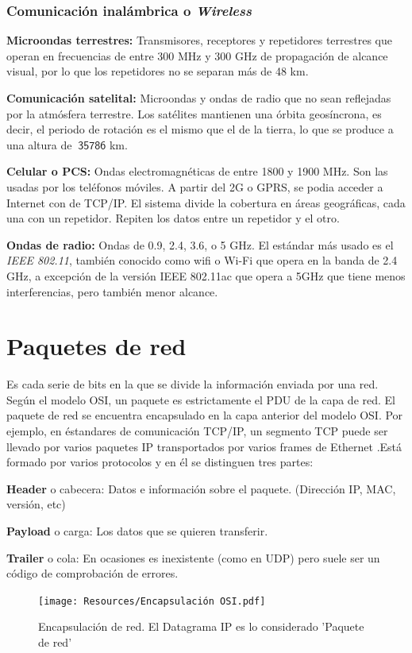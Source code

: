 \documentclass[a4paper, 11pt]{report} %
\begin{document}
\subsubsection{Comunicación inalámbrica o \textit{Wireless}}
\begin{description}
\item \textbf{Microondas terrestres:} Transmisores, receptores y repetidores terrestres que operan en frecuencias de entre 300 MHz y 300 GHz de propagación de alcance visual, por lo que los repetidores no se separan más de 48 km.
\item \textbf{Comunicación satelital:} Microondas y ondas de radio que no sean reflejadas por la atmósfera terrestre. Los satélites mantienen una órbita geosíncrona, es decir, el periodo de rotación es el mismo que el de la tierra, lo que se produce a una altura de $\mathsf{~35786}$ km.
\item \textbf{Celular o PCS:} Ondas electromagnéticas de entre 1800 y 1900 MHz. Son las usadas por los teléfonos móviles. A partir del 2G o GPRS, se podia acceder a Internet con de TCP/IP. El sistema divide la cobertura en áreas geográficas, cada una con un repetidor. Repiten los datos entre un repetidor y el otro.
\item \textbf{Ondas de radio:} Ondas de 0.9, 2.4, 3.6, o 5 GHz. El estándar más usado es el \textit{IEEE 802.11}, también conocido como wifi o Wi-Fi que opera en la banda de 2.4 GHz, a excepción de la versión IEEE 802.11ac que opera a 5GHz que tiene menos interferencias, pero también menor alcance.
\end{description}

\section{Paquetes de red}
Es cada serie de bits en la que se divide la información enviada por una red. Según el modelo OSI, un paquete es estrictamente el PDU de la capa de red. El paquete de red se encuentra encapsulado en la capa anterior del modelo OSI. Por ejemplo, en éstandares de comunicación TCP/IP, un segmento TCP puede ser llevado por varios paquetes IP transportados por varios frames de Ethernet .Está formado por varios protocolos y en él se distinguen tres partes:
\begin{description}
\item \textbf{Header} o cabecera: Datos e información sobre el paquete. (Dirección IP, MAC, versión, etc)
\item \textbf{Payload} o carga: Los datos que se quieren transferir.
\item \textbf{Trailer} o cola: En ocasiones es inexistente (como en UDP) pero suele ser un código de comprobación de errores.
\end{description}
\begin{figure}[H]
\noindent
\centering
\texttt{[image: Resources/Encapsulación OSI.pdf]}
\caption{Encapsulación de red. El Datagrama IP es lo considerado 'Paquete de red'}
\end{figure}
\end{document}
